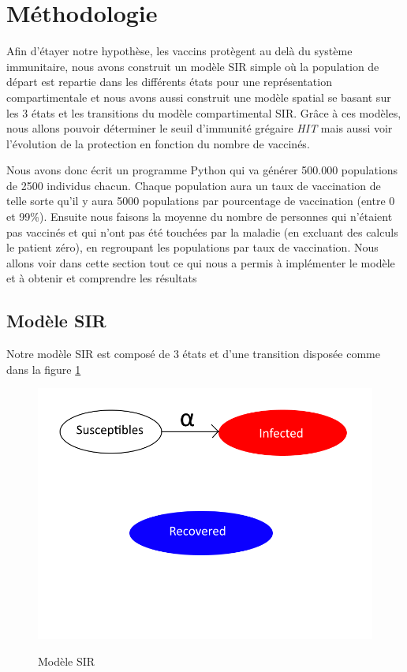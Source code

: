 \documentclass[journal, a4paper]{IEEEtran}
\begin{document}
\section{Méthodologie}\label{sec:met}
	Afin d'étayer notre hypothèse, les vaccins protègent au delà du système immunitaire, nous avons construit un modèle SIR simple où la population de départ est repartie dans les différents états pour une représentation compartimentale et nous avons aussi construit une modèle spatial se basant sur les 3 états et les transitions du modèle compartimental SIR.
	Grâce à ces modèles, nous allons pouvoir déterminer le seuil d'immunité grégaire \emph{HIT} mais aussi voir l'évolution de la protection en fonction du nombre de vaccinés.

	Nous avons donc écrit un programme Python qui va générer 500.000 populations de 2500 individus chacun. Chaque population aura un taux de vaccination de telle sorte qu'il y aura 5000 populations par pourcentage de vaccination (entre 0 et 99\%). Ensuite nous faisons la moyenne du nombre de personnes qui n'étaient pas vaccinés et qui n'ont pas été touchées par la maladie (en excluant des calculs le patient zéro), en regroupant les populations par taux de vaccination. Nous allons voir dans cette section tout ce qui nous a permis à implémenter le modèle et à obtenir et comprendre les résultats


	\subsection{Modèle SIR}
	Notre modèle SIR est composé de 3 états et d'une transition disposée comme dans la figure \ref{fig:MySIR}

	\begin{figure}[!hbt]
		\caption{Modèle SIR}
		\includegraphics[width=\columnwidth]{MySIR}
		\label{fig:MySIR}
	\end{figure}
\end{document}
